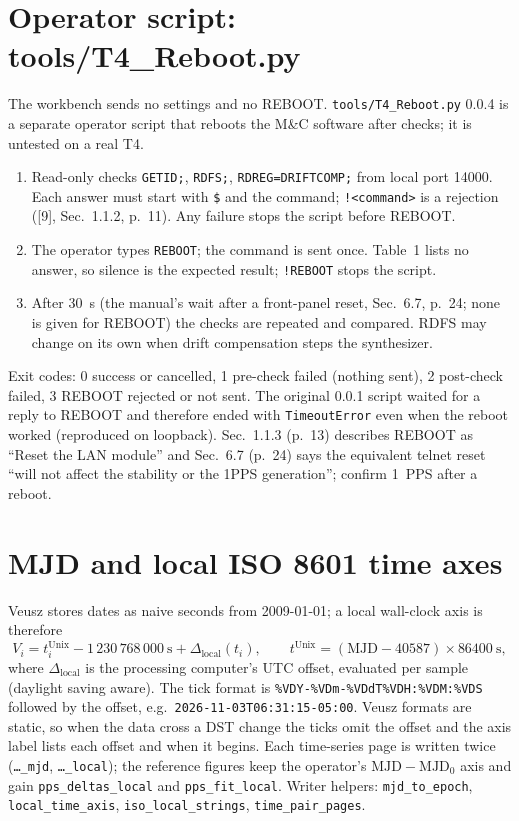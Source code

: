 \documentclass[11pt,a4paper]{article}
\newcommand{\tfournet}{[9]}
\begin{document}
\section{Operator script: tools/T4\_Reboot.py}
The workbench sends no settings and no REBOOT. \texttt{tools/T4\_Reboot.py} 0.0.4 is a separate
operator script that reboots the M\&C software after checks; it is untested on a real T4.
\begin{enumerate}[leftmargin=6mm]
\item Read-only checks \texttt{GETID;}, \texttt{RDFS;}, \texttt{RDREG=DRIFTCOMP;} from local port
14000. Each answer must start with \texttt{\$} and the command; \texttt{!<command>} is a rejection
(\tfournet, Sec.~1.1.2, p.~11). Any failure stops the script before REBOOT.
\item The operator types \texttt{REBOOT}; the command is sent once. Table~1 lists no answer, so
silence is the expected result; \texttt{!REBOOT} stops the script.
\item After 30~s (the manual's wait after a front-panel reset, Sec.~6.7, p.~24; none is given for
REBOOT) the checks are repeated and compared. RDFS may change on its own when drift compensation
steps the synthesizer.
\end{enumerate}
Exit codes: 0 success or cancelled, 1 pre-check failed (nothing sent), 2 post-check failed,
3 REBOOT rejected or not sent. The original 0.0.1 script waited for a reply to REBOOT and therefore
ended with \texttt{TimeoutError} even when the reboot worked (reproduced on loopback). Sec.~1.1.3
(p.~13) describes REBOOT as ``Reset the LAN module'' and Sec.~6.7 (p.~24) says the equivalent
telnet reset ``will not affect the stability or the 1PPS generation''; confirm 1~PPS after a reboot.

\section{MJD and local ISO 8601 time axes}
Veusz stores dates as naive seconds from 2009-01-01; a local wall-clock axis is therefore
\[
V_i=t_i^{\mathrm{Unix}}-1\,230\,768\,000\ \mathrm{s}+\Delta_{\mathrm{local}}(t_i),\qquad
t^{\mathrm{Unix}}=(\mathrm{MJD}-40587)\times86400\ \mathrm{s},
\]
where $\Delta_{\mathrm{local}}$ is the processing computer's UTC offset, evaluated per sample
(daylight saving aware). The tick format is \verb|%VDY-%VDm-%VDdT%VDH:%VDM:%VDS| followed by
the offset, e.g.\ \texttt{2026-11-03T06:31:15-05:00}. Veusz formats are static, so when the data
cross a DST change the ticks omit the offset and the axis label lists each offset and when it
begins. Each time-series page is written twice (\texttt{\dots\_mjd}, \texttt{\dots\_local}); the
reference figures keep the operator's $\mathrm{MJD}-\mathrm{MJD}_0$ axis and gain
\texttt{pps\_deltas\_local} and \texttt{pps\_fit\_local}. Writer helpers: \texttt{mjd\_to\_epoch},
\texttt{local\_time\_axis}, \texttt{iso\_local\_strings}, \texttt{time\_pair\_pages}.
\end{document}
